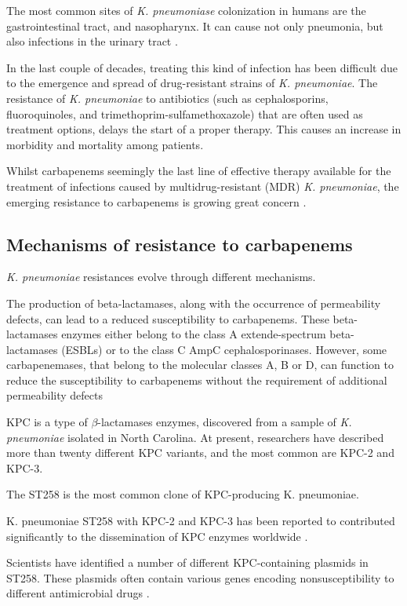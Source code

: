 \documentclass[11pt]{report}
\begin{document}
The most common sites of \emph{K. pneumoniase} colonization in humans are the gastrointestinal tract, and nasopharynx.
It can cause not only pneumonia, but also infections in the urinary tract \cite{Pitout2015, podschun1998klebsiella}.

In the last couple of decades, treating this kind of infection has been difficult due to the emergence and spread of drug-resistant strains of \emph{K. pneumoniae}.
The resistance of \emph{K. pneumoniae} to antibiotics (such as cephalosporins, fluoroquinoles, and trimethoprim-sulfamethoxazole) that are often used as treatment options, delays the start of a proper therapy.
This causes an increase in morbidity and mortality among patients.

Whilst carbapenems seemingly the last line of effective therapy available for the treatment of infections caused by multidrug-resistant (MDR) \emph{K. pneumoniae}, the emerging resistance to carbapenems is growing great concern
 \cite{Pitout2015}.

\subsection{Mechanisms of resistance to carbapenems} 

\emph{K. pneumoniae} resistances evolve through different mechanisms.

The production of beta-lactamases, along with the occurrence of permeability defects, can lead to a reduced susceptibility to carbapenems.
These beta-lactamases enzymes either belong to the class A extende-spectrum beta-lactamases (ESBLs) or to the class C AmpC cephalosporinases.
However, some carbapenemases, that belong to the molecular classes A, B or D, can function to reduce the susceptibility to carbapenems without the requirement of additional permeability defects

KPC is a type of $\beta$-lactamases enzymes, discovered from a sample of \emph{K. pneumoniae} isolated in North Carolina. At present, researchers have described more than twenty different KPC variants, and the most common are KPC-2 and KPC-3.

The ST258 is the most common clone of KPC-producing K. pneumoniae.  

K. pneumoniae ST258 with KPC-2 and KPC-3 has been reported to contributed significantly to the dissemination of KPC enzymes worldwide \cite{Pitout2015}.

Scientists have identified a number of different KPC-containing plasmids in ST258. These plasmids often contain various genes encoding nonsusceptibility to different antimicrobial drugs \cite{Pitout2015}.
\end{document}
